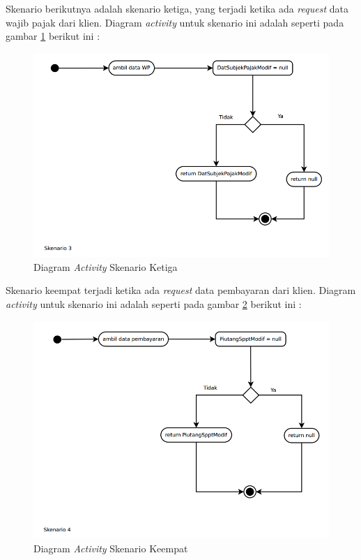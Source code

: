 Skenario berikutnya adalah skenario ketiga, yang terjadi ketika ada \textit{request} data wajib pajak dari klien. Diagram \textit{activity} untuk skenario ini adalah seperti pada gambar \ref{fig:act-dia-be-3} berikut ini :

\begin{figure}[H]
	\centering
	\includegraphics[width=1\textwidth]{./resources/uml/activity-dia-3}
	\caption{Diagram \textit{Activity} Skenario Ketiga}
	\label{fig:act-dia-be-3}
\end{figure}

Skenario keempat terjadi ketika ada \textit{request} data pembayaran dari klien. Diagram \textit{activity} untuk skenario ini adalah seperti pada gambar \ref{fig:act-dia-be-4} berikut ini :

\begin{figure}[H]
	\centering
	\includegraphics[width=1\textwidth]{./resources/uml/activity-dia-4}
	\caption{Diagram \textit{Activity} Skenario Keempat}
	\label{fig:act-dia-be-4}
\end{figure}

